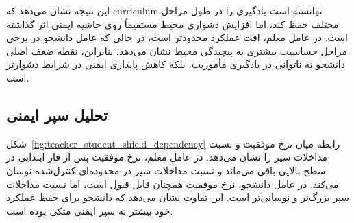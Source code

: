 این نتیجه نشان می‌دهد که curriculum توانسته است یادگیری را در طول مراحل مختلف حفظ کند، اما افزایش دشواری محیط مستقیماً روی حاشیه ایمنی اثر گذاشته است. در عامل معلم، افت عملکرد محدودتر است، در حالی که عامل دانشجو در برخی مراحل حساسیت بیشتری به پیچیدگی محیط نشان می‌دهد. بنابراین، نقطه ضعف اصلی دانشجو نه ناتوانی در یادگیری مأموریت، بلکه کاهش پایداری ایمنی در شرایط دشوارتر است.

\subsection{تحلیل سپر ایمنی}
\label{subsec:shield_analysis}

شکل~\ref{fig:teacher_student_shield_dependency} رابطه میان نرخ موفقیت و نسبت مداخلات سپر را نشان می‌دهد. در عامل معلم، نرخ موفقیت پس از فاز ابتدایی در سطح بالایی باقی می‌ماند و نسبت مداخلات سپر در محدوده‌ای کنترل‌شده نوسان می‌کند. در عامل دانشجو، نرخ موفقیت همچنان قابل قبول است، اما نسبت مداخلات سپر بزرگ‌تر و نوسانی‌تر است. این تفاوت نشان می‌دهد که دانشجو برای حفظ عملکرد خود بیشتر به سپر ایمنی متکی بوده است.

